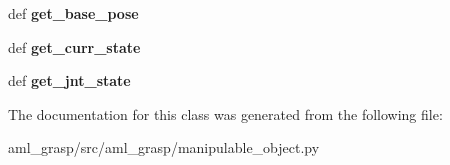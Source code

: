 \begin{DoxyCompactItemize}
\item 
\hypertarget{classaml__grasp_1_1manipulable__object_1_1_manipulable_object_a8b79428ace5522a27f390ca27ba738d8}{def {\bfseries get\-\_\-base\-\_\-pose}}\label{classaml__grasp_1_1manipulable__object_1_1_manipulable_object_a8b79428ace5522a27f390ca27ba738d8}

\item 
\hypertarget{classaml__grasp_1_1manipulable__object_1_1_manipulable_object_a5f99e1a301e57721d09bd2a9a481ecd6}{def {\bfseries get\-\_\-curr\-\_\-state}}\label{classaml__grasp_1_1manipulable__object_1_1_manipulable_object_a5f99e1a301e57721d09bd2a9a481ecd6}

\item 
\hypertarget{classaml__grasp_1_1manipulable__object_1_1_manipulable_object_a81a17359b1bf534dc847dc6c5b4bf129}{def {\bfseries get\-\_\-jnt\-\_\-state}}\label{classaml__grasp_1_1manipulable__object_1_1_manipulable_object_a81a17359b1bf534dc847dc6c5b4bf129}

\end{DoxyCompactItemize}


The documentation for this class was generated from the following file\-:\begin{DoxyCompactItemize}
\item 
aml\-\_\-grasp/src/aml\-\_\-grasp/manipulable\-\_\-object.\-py\end{DoxyCompactItemize}
